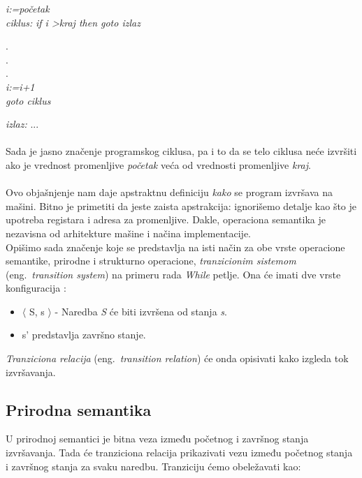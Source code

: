 \documentclass[a4paper]{article}
\begin{document}
{\hspace{4cm} \textit{i:=početak}\\
\textit{ciklus:} \hspace{3cm} \textit{if i \textgreater kraj then goto izlaz}
\begin{center}
.
\\.
\\.
\\ \textit{i:=i+1}
\\ \textit{goto ciklus}
\end{center}
\textit{izlaz:} \hspace{4cm} ...\\
\\Sada je jasno značenje programskog ciklusa, pa i to da se telo ciklusa neće izvršiti ako je vrednost promenljive \textit{početak} veća od vrednosti promenljive \textit{kraj}.\\
\\Ovo objašnjenje nam daje apstraktnu definiciju \textit{kako} se program izvršava na mašini. Bitno je primetiti da jeste zaista apstrakcija: ignorišemo detalje kao što je upotreba registara i adresa za promenljive. Dakle, operaciona semantika je nezavisna od arhitekture mašine i načina implementacije.\\

Opišimo sada značenje koje se predstavlja na isti način za obe vrste operacione semantike, prirodne i strukturno operacione, \textit{tranzicionim sistemom} (eng.~{\em transition system}) na primeru rada \emph{While} petlje. Ona će imati dve vrste konfiguracija \cite{willey}:
\begin{itemize}
	\item $\langle$ S, s $\rangle$ - Naredba \textit{S} će biti izvršena od stanja \textit{s}.
	\item s' predstavlja završno stanje.
\end{itemize}
\textit{Tranziciona relacija} (eng.~{\em transition relation}) će onda opisivati kako izgleda tok izvršavanja. \\

\subsection{Prirodna semantika}

\qquad U prirodnoj semantici je bitna veza između početnog i završnog stanja izvršavanja. Tada će tranziciona relacija prikazivati vezu između početnog stanja i završnog stanja za svaku naredbu. Tranziciju ćemo obeležavati kao:

}
\end{document}
